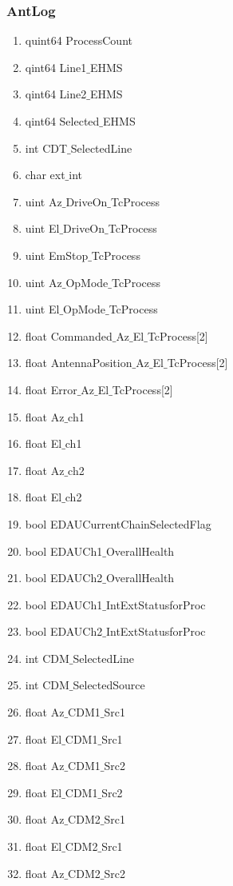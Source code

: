\begin{enumerate}
\subsubsection{AntLog}
\begin{enumerate}
	\item quint64 ProcessCount
	\item qint64 Line1$\_$EHMS
	\item qint64 Line2$\_$EHMS
	\item qint64 Selected$\_$EHMS
	\item int CDT$\_$SelectedLine
	\item char ext$\_$int
	\item uint Az$\_$DriveOn$\_$TcProcess
	\item uint El$\_$DriveOn$\_$TcProcess
	\item uint EmStop$\_$TcProcess
	\item uint Az$\_$OpMode$\_$TcProcess
	\item uint El$\_$OpMode$\_$TcProcess
	\item float Commanded$\_$Az$\_$El$\_$TcProcess[2]
	\item float AntennaPosition$\_$Az$\_$El$\_$TcProcess[2]
	\item float Error$\_$Az$\_$El$\_$TcProcess[2]
	\item float Az$\_$ch1
	\item float El$\_$ch1
	\item float Az$\_$ch2
	\item float El$\_$ch2
	\item bool EDAUCurrentChainSelectedFlag
	\item bool EDAUCh1$\_$OverallHealth
	\item bool EDAUCh2$\_$OverallHealth
	\item bool EDAUCh1$\_$IntExtStatusforProc
	\item bool EDAUCh2$\_$IntExtStatusforProc
	\item int CDM$\_$SelectedLine
	\item int CDM$\_$SelectedSource
	\item float Az$\_$CDM1$\_$Src1
	\item float El$\_$CDM1$\_$Src1
	\item float Az$\_$CDM1$\_$Src2
	\item float El$\_$CDM1$\_$Src2
	\item float Az$\_$CDM2$\_$Src1
	\item float El$\_$CDM2$\_$Src1
	\item float Az$\_$CDM2$\_$Src2

\end{enumerate}
\end{enumerate}
